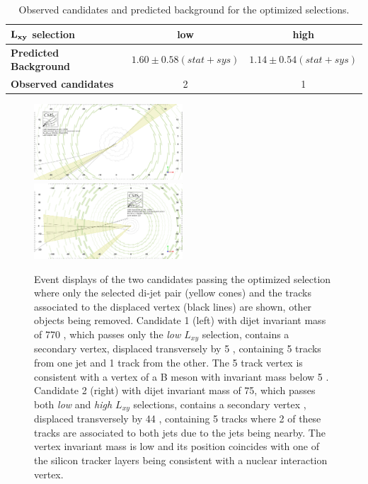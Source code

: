\begin{table}[htbp]
\centering
\begin{tabular}{|l|c|c|}
\hline
$\bf L_{xy}$ \bf selection & \bf low & \bf high \\
\hline
\bf Predicted Background & $ 1.60\pm0.58(stat+sys)$ & $ 1.14\pm0.54(stat+sys)$ \\
\hline
\bf Observed candidates & 2 & 1 \\ 
\hline
\end{tabular}
\caption{Observed candidates and predicted background for the optimized selections.\label{tab:fullunblinding}}
\end{table}

\begin{figure}
\centering
\includegraphics[width=0.495\textwidth]{plots/displays/ev1_vtx.png}
\includegraphics[width=0.495\textwidth]{plots/displays/ev2_vtx.png}

\caption{Event displays of the two candidates passing the optimized selection where only the selected di-jet pair
 (yellow cones) and 
the tracks associated to the displaced vertex (black lines) are shown, other objects being removed. 
Candidate 1 (left) with dijet invariant mass of 770 \GeVcc, which 
passes only the {\it low $L_{xy}$} selection, 
contains a secondary vertex, displaced transversely by 5 \cm, containing 5 tracks from one jet and 1 track
from the other. The 5 track vertex is consistent with a vertex of a B meson with invariant mass below 5 \GeVcc.
Candidate 2 (right) with dijet invariant mass of 75\GeVcc, 
which passes both {\it low} and {\it high $L_{xy}$} selections, contains a secondary vertex
, displaced transversely by 44 \cm, containing 5 tracks where 2 of these tracks are
associated to both jets due to the jets being nearby. The vertex invariant mass is low and its position
 coincides with one of the silicon 
tracker layers being consistent with a nuclear interaction vertex. \label{fig:eventDisplays}}
\end{figure} 



